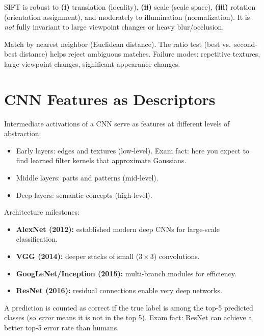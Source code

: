 \documentclass[11pt, oneside]{book}
\begin{document}
\begin{notebox}[title={SIFT Invariances and Limitations}]
SIFT is robust to \textbf{(i)} translation (locality), \textbf{(ii)} scale (scale space),
\textbf{(iii)} rotation (orientation assignment), and moderately to illumination (normalization).
It is \emph{not} fully invariant to large viewpoint changes or heavy blur/occlusion.
\end{notebox}

Match by nearest neighbor (Euclidean distance). The ratio test (best vs.\ second-best distance)
helps reject ambiguous matches. Failure modes: repetitive textures, large viewpoint changes, significant appearance changes.

\section{CNN Features as Descriptors}

Intermediate activations of a CNN serve as features at different levels of abstraction:
\begin{itemize}
  \item Early layers: edges and textures (low-level). Exam fact: here you expect to find learned filter kernels that approximate Gaussians.
  \item Middle layers: parts and patterns (mid-level).
  \item Deep layers: semantic concepts (high-level).
\end{itemize}

Architecture milestones:
\begin{itemize}
  \item \textbf{AlexNet (2012):} established modern deep CNNs for large-scale classification.
  \item \textbf{VGG (2014):} deeper stacks of small ($3\times3$) convolutions.
  \item \textbf{GoogLeNet/Inception (2015):} multi-branch modules for efficiency.
  \item \textbf{ResNet (2016):} residual connections enable very deep networks.
\end{itemize}

\begin{notebox}[title={Top-5 Error Rate}]
A prediction is counted as correct if the true label is among the top-5 predicted classes (so \emph{error} means it is not in the top 5).
Exam fact: ResNet can achieve a better top-5 error rate than humans.
\end{notebox}
\end{document}
